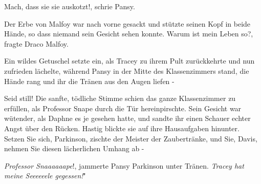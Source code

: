 \glqq Mach, dass sie sie auskotzt!\grqq{}, schrie Pansy.

Der Erbe von Malfoy war nach vorne gesackt und stützte seinen Kopf in beide
Hände, so dass niemand sein Gesicht sehen konnte. \glqq Warum ist mein Leben
so?\grqq{}, fragte Draco Malfoy.

Ein wildes Getuschel setzte ein, als Tracey zu ihrem Pult zurückkehrte und nun
zufrieden lächelte, während Pansy in der Mitte des Klassenzimmers stand, die
Hände rang und ihr die Tränen aus den Augen liefen -

\glqq Seid still!\grqq{} Die sanfte, tödliche Stimme schien das ganze
Klassenzimmer zu erfüllen, als Professor Snape durch die Tür hereinpirschte.
Sein Gesicht war wütender, als Daphne es je gesehen hatte, und sandte ihr einen
Schauer echter Angst über den Rücken. Hastig blickte sie auf ihre Hausaufgaben
hinunter. \glqq Setzen Sie sich, Parkinson\grqq{}, zischte der Meister der
Zaubertränke, \glqq und Sie, Davis, nehmen Sie diesen lächerlichen Umhang ab
-\grqq{}

\glqq \emph{Professor Snaaaaaape}!\grqq{}, jammerte Pansy Parkinson unter
Tränen. \glqq \emph{Tracey hat }\emph{meine Seeeeeele gegessen!}"

